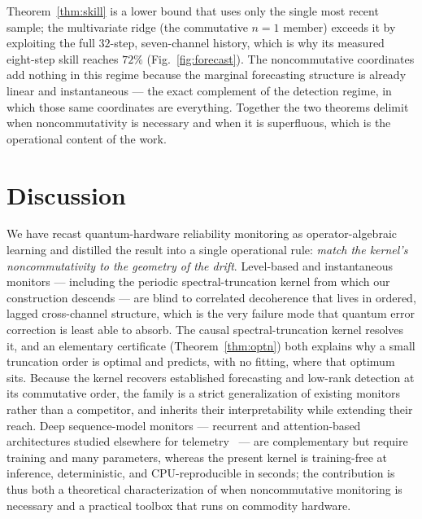 \documentclass[
  aps,
  prresearch,
  reprint,
  amsmath,
  amssymb,
  nofootinbib,
  floatfix,
]{revtex4-2}
\begin{document}
\noindent Theorem~\ref{thm:skill} is a lower bound that uses only the single most
recent sample; the multivariate ridge (the commutative $n{=}1$ member) exceeds it by
exploiting the full $32$-step, seven-channel history, which is why its measured
eight-step skill reaches $72\%$ (Fig.~\ref{fig:forecast}). The noncommutative
coordinates add nothing in this regime because the marginal forecasting structure is
already linear and instantaneous --- the exact complement of the detection regime, in
which those same coordinates are everything. Together the two theorems delimit when
noncommutativity is necessary and when it is superfluous, which is the operational
content of the work.

\section{Discussion}

We have recast quantum-hardware reliability monitoring as operator-algebraic
learning and distilled the result into a single operational rule: \emph{match the
kernel's noncommutativity to the geometry of the drift}. Level-based and
instantaneous monitors --- including the periodic spectral-truncation kernel from
which our construction descends --- are blind to correlated decoherence that lives in
ordered, lagged cross-channel structure, which is the very failure mode that quantum
error correction is least able to absorb. The causal spectral-truncation kernel
resolves it, and an elementary certificate (Theorem~\ref{thm:optn}) both explains
why a small truncation order is optimal and predicts, with no fitting, where that
optimum sits. Because the kernel recovers established forecasting and low-rank
detection at its commutative order, the family is a strict generalization of
existing monitors rather than a competitor, and inherits their interpretability
while extending their reach. Deep sequence-model monitors --- recurrent
\citep{hochreiter1997lstm,cho2014gru} and attention-based
\citep{vaswani2017attention} architectures studied elsewhere for
telemetry~\citep{lim2021forecasting,wen2023transformers} --- are complementary but
require training and many parameters, whereas the present kernel is training-free at
inference, deterministic, and CPU-reproducible in seconds; the contribution is thus
both a theoretical characterization of when noncommutative monitoring is necessary
and a practical toolbox that runs on commodity hardware.
\end{document}
